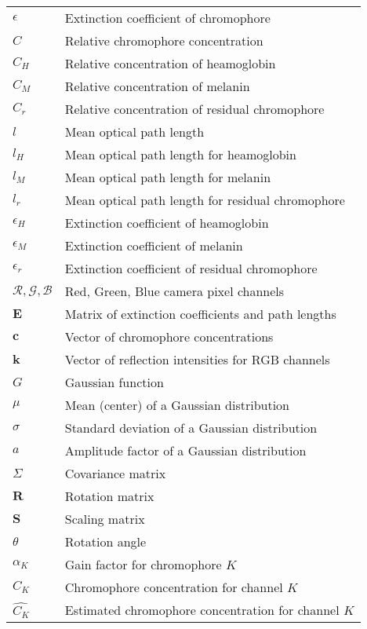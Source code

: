 \begin{spacing}{1.5}
\begin{table}[ht]
\begin{tabular}{ll}
\textbf{$\epsilon$} & Extinction coefficient of chromophore \\
\textbf{$C$} & Relative chromophore concentration \\
\textbf{$C_H$} & Relative concentration of heamoglobin \\
\textbf{$C_M$} & Relative concentration of melanin \\
\textbf{$C_r$} & Relative concentration of residual chromophore \\
\textbf{$l$} & Mean optical path length \\
\textbf{$l_H$} & Mean optical path length for heamoglobin \\
\textbf{$l_M$} & Mean optical path length for melanin \\
\textbf{$l_r$} & Mean optical path length for residual chromophore \\
\textbf{$\epsilon_H$} & Extinction coefficient of heamoglobin \\
\textbf{$\epsilon_M$} & Extinction coefficient of melanin \\
\textbf{$\epsilon_r$} & Extinction coefficient of residual chromophore \\
\textbf{$\mathcal{R}, \mathcal{G}, \mathcal{B}$} & Red, Green, Blue camera pixel channels \\
\textbf{$\mathbf{E}$} & Matrix of extinction coefficients and path lengths \\
\textbf{$\mathbf{c}$} & Vector of chromophore concentrations \\
\textbf{$\mathbf{k}$} & Vector of reflection intensities for RGB channels \\
\textbf{$G$} & Gaussian function \\
\textbf{$\mu$} & Mean (center) of a Gaussian distribution \\
\textbf{$\sigma$} & Standard deviation of a Gaussian distribution \\
\textbf{$a$} & Amplitude factor of a Gaussian distribution \\
\textbf{$\Sigma$} & Covariance matrix \\
\textbf{$\mathbf{R}$} & Rotation matrix \\
\textbf{$\mathbf{S}$} & Scaling matrix \\
\textbf{$\theta$} & Rotation angle \\
\textbf{$\alpha_K$} & Gain factor for chromophore $K$ \\
\textbf{$C_K$} & Chromophore concentration for channel $K$ \\
\textbf{$\hat{C_K}$} & Estimated chromophore concentration for channel $K$ \\

\end{tabular}
\end{table}
\end{spacing}
